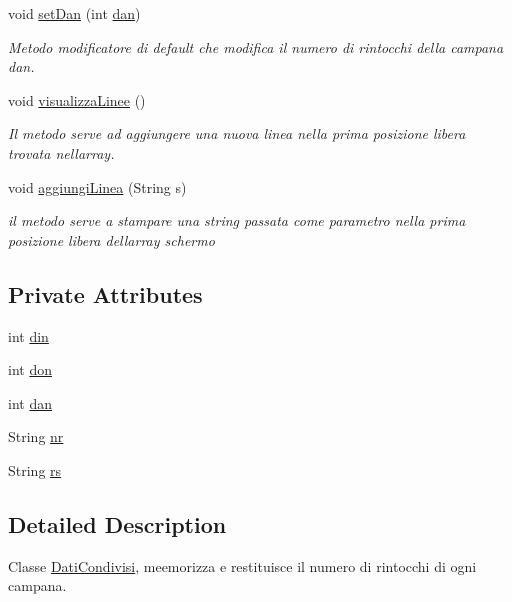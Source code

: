 \begin{DoxyCompactItemize}
void \hyperlink{classcampane_1_1_dati_condivisi_a0af8623c62b599c95f970b3f3d97da3a}{set\+Dan} (int \hyperlink{classcampane_1_1_dati_condivisi_afcdc45755cdcbdea516dc94b3db2301f}{dan})
\begin{DoxyCompactList}\small\item\em Metodo modificatore di default che modifica il numero di rintocchi della campana \textquotesingle{}dan\textquotesingle{}. \end{DoxyCompactList}\item 
void \hyperlink{classcampane_1_1_dati_condivisi_a7bab9fc262a791bb644c1a11f0c0bc46}{visualizza\+Linee} ()
\begin{DoxyCompactList}\small\item\em Il metodo serve ad aggiungere una nuova linea nella prima posizione libera trovata nell\textquotesingle{}array. \end{DoxyCompactList}\item 
void \hyperlink{classcampane_1_1_dati_condivisi_a7ded9a23a6e1e44ea170adc4b243aa20}{aggiungi\+Linea} (String s)
\begin{DoxyCompactList}\small\item\em il metodo serve a stampare una string passata come parametro nella prima posizione libera dell\textquotesingle{}array \textquotesingle{}schermo\textquotesingle{} \end{DoxyCompactList}\end{DoxyCompactItemize}
\subsection*{Private Attributes}
\begin{DoxyCompactItemize}
\item 
int \hyperlink{classcampane_1_1_dati_condivisi_a7f432241955f773b6cc92136a349bf87}{din}
\item 
int \hyperlink{classcampane_1_1_dati_condivisi_ad91fff4fe648ed3a29461c07bef850da}{don}
\item 
int \hyperlink{classcampane_1_1_dati_condivisi_afcdc45755cdcbdea516dc94b3db2301f}{dan}
\item 
String \hyperlink{classcampane_1_1_dati_condivisi_ae008b53823e232ad42a78357f1f8069e}{nr}
\item 
String \hyperlink{classcampane_1_1_dati_condivisi_a2a2ac2d508a6792e74d24e27bd656ef9}{rs}
\end{DoxyCompactItemize}


\subsection{Detailed Description}
Classe \hyperlink{classcampane_1_1_dati_condivisi}{Dati\+Condivisi}, meemorizza e restituisce il numero di rintocchi di ogni campana. 

